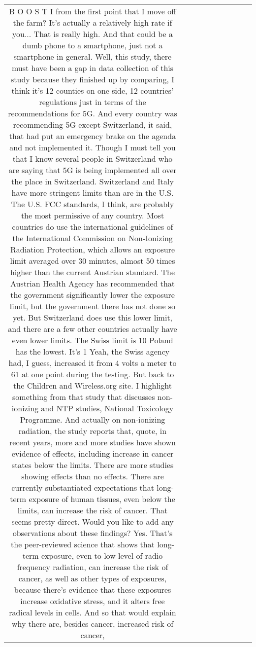 \begin{table}[h!]
\begin{tabular}{|c|c|c|c|c|c|c|c|c|c|}
B O O S T I from the first point that I move off the farm?
It's actually a relatively high rate if you...
That is really high.
And that could be a dumb phone to a smartphone, just not a smartphone in general.
Well, this study, there must have been a gap in data collection of this study
because they finished up by comparing, I think it's 12 counties on one side,
12 countries' regulations just in terms of the recommendations for 5G.
And every country was recommending 5G except Switzerland, it said,
that had put an emergency brake on the agenda and not implemented it.
Though I must tell you that I know several people in Switzerland who are saying that 5G is being implemented all over the place in Switzerland.
Switzerland and Italy have more stringent limits than are in the U.S.
The U.S. FCC standards, I think, are probably the most permissive of any country.
Most countries do use the international guidelines of the International Commission on Non-Ionizing Radiation Protection,
which allows an exposure limit averaged over 30 minutes, almost 50 times higher than the current Austrian standard.
The Austrian Health Agency has recommended that the government significantly lower the exposure limit,
but the government there has not done so yet.
But Switzerland does use this lower limit, and there are a few other countries actually have even lower limits.
The Swiss limit is 10%
Poland has the lowest.
It's 1%
Yeah, the Swiss agency had, I guess, increased it from 4 volts a meter to 61 at one point during the testing.
But back to the Children and Wireless.org site.
I highlight something from that study that discusses non-ionizing and NTP studies, National Toxicology Programme.
And actually on non-ionizing radiation, the study reports that, quote,
in recent years, more and more studies have shown evidence of effects, including increase in cancer states below the limits.
There are more studies showing effects than no effects.
There are currently substantiated expectations that long-term exposure of human tissues,
even below the limits, can increase the risk of cancer.
That seems pretty direct.
Would you like to add any observations about these findings?
Yes.
That's the peer-reviewed science that shows that long-term exposure, even to low level of radio frequency radiation,
can increase the risk of cancer,
as well as other types of exposures,
because there's evidence that these exposures increase oxidative stress,
and it alters free radical levels in cells.
And so that would explain why there are, besides cancer, increased risk of cancer,

\end{tabular}
\end{table}
